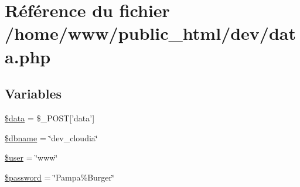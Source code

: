 \hypertarget{data_8php}{\section{Référence du fichier /home/www/public\-\_\-html/dev/data.php}
\label{data_8php}
}
\subsection*{Variables}
\begin{DoxyCompactItemize}
\item 
\hyperlink{data_8php_a6efc15b5a2314dd4b5aaa556a375c6d6}{\$data} = \$\-\_\-\-P\-O\-S\-T\mbox{[}'data'\mbox{]}
\item 
\hyperlink{data_8php_ac5111a571fffa2499732833bb7f0d8c1}{\$dbname} = \char`\"{}dev\-\_\-cloudia\char`\"{}
\item 
\hyperlink{data_8php_a598ca4e71b15a1313ec95f0df1027ca5}{\$user} = \char`\"{}www\char`\"{}
\item 
\hyperlink{data_8php_a607686ef9f99ea7c42f4f3dd3dbb2b0d}{\$password} = \char`\"{}Pampa\%Burger\char`\"{}
\end{DoxyCompactItemize}


